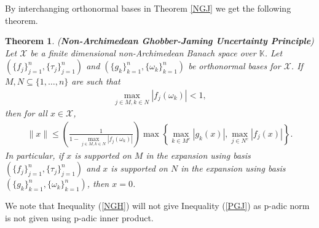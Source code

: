\documentclass{amsart}
\newtheorem{theorem}{Theorem}[section]
\begin{document}
By interchanging orthonormal bases in Theorem  \ref{NGJ} we  get the following theorem. 
\begin{theorem}
	(\textbf{Non-Archimedean  Ghobber-Jaming  Uncertainty Principle})
Let $\mathcal{X}$  be a finite dimensional non-Archimedean Banach  space over $\mathbb{K}$.	Let $(\{f_j\}_{j=1}^n, \{\tau_j\}_{j=1}^n)$	and $(\{g_k\}_{k=1}^n, \{\omega_k\}_{k=1}^n)$ be orthonormal bases  for $\mathcal{X}$.  If $M,N\subseteq \{1, \dots, n\}$ are such that 
\begin{align*}
	\displaystyle \max_{j \in M, k \in N}|f_j(\omega_k)|<1,
\end{align*}
then for all $x \in \mathcal{X}$, 	
\begin{align*}
	\|x\|\leq  \left(\frac{1}{1-\displaystyle \max_{j \in M, k \in N}|f_j(\omega_k)|}\right)\max\left\{\displaystyle \max_{k \in M^c}|g_k(x) |, \displaystyle \max_{j \in N^c}|f_j(x)|\right\}.
\end{align*}
In particular, if $x$ is supported on $M$ in the expansion using basis $(\{f_j\}_{j=1}^n, \{\tau_j\}_{j=1}^n)$ and $x$ is supported on $N$ in the expansion using basis $(\{g_k\}_{k=1}^n, \{\omega_k\}_{k=1}^n)$, then $x=0$. 
\end{theorem}
We note that Inequality (\ref{NGH}) will not give Inequality (\ref{PGJ})  as p-adic norm is not given using p-adic inner product.
\end{document}
